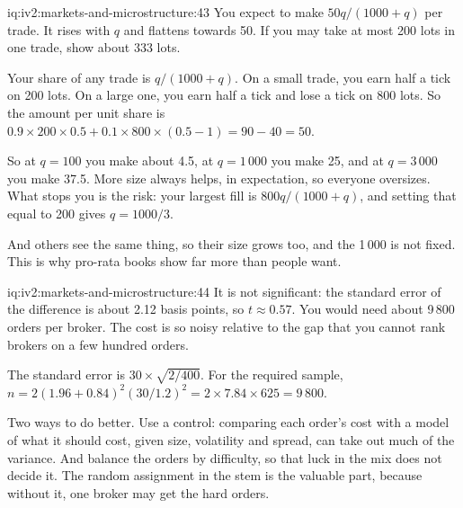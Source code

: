 \begin{solution}{iq:iv2:markets-and-microstructure:43}
You expect to make $50q/(1000 + q)$ per trade. It rises with $q$ and flattens towards 50. If you may take at most 200 lots in one trade, show about 333 lots.

Your share of any trade is $q/(1000 + q)$. On a small trade, you earn half a tick on 200 lots. On a large one, you earn half a tick and lose a tick on 800 lots. So the amount per unit share is $0.9 \times 200 \times 0.5 + 0.1 \times 800 \times (0.5 - 1) = 90 - 40 = 50$.

So at $q = 100$ you make about 4.5, at $q = 1\,000$ you make 25, and at $q = 3\,000$ you make 37.5. More size always helps, in expectation, so everyone oversizes. What stops you is the risk: your largest fill is $800q/(1000 + q)$, and setting that equal to 200 gives $q = 1000/3$.

And others see the same thing, so their size grows too, and the 1\,000 is not fixed. This is why pro-rata books show far more than people want.

\end{solution}

\begin{solution}{iq:iv2:markets-and-microstructure:44}
It is not significant: the standard error of the difference is about 2.12 basis points, so $t \approx 0.57$. You would need about 9\,800 orders per broker. The cost is so noisy relative to the gap that you cannot rank brokers on a few hundred orders.

The standard error is $30 \times \sqrt{2/400}$. For the required sample, $n = 2(1.96 + 0.84)^2(30/1.2)^2 = 2 \times 7.84 \times 625 = 9\,800$.

Two ways to do better. Use a control: comparing each order's cost with a model of what it should cost, given size, volatility and spread, can take out much of the variance. And balance the orders by difficulty, so that luck in the mix does not decide it. The random assignment in the stem is the valuable part, because without it, one broker may get the hard orders.

\end{solution}

